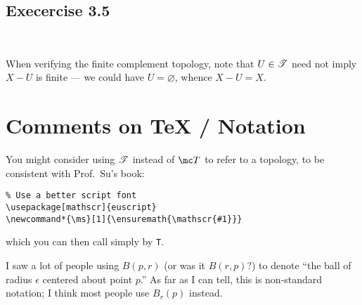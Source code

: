 \documentclass{fkpset}
\begin{document}
\subsection{Execercise 3.5}~
\begin{problem}[B1]
  When verifying the finite complement topology, note that $U \in \ms T$ need
  not imply $X - U$ is finite --- we could have $U = \varnothing$, whence $X - U
  = X$.
\end{problem}

\section{Comments on TeX / Notation}
\begin{problem}[C1]
  You might consider using $\ms T$ instead of $\mc T$ to refer to a topology, to
  be consistent with Prof.\ Su's book:
  \begin{lstlisting}
% Use a better script font
\usepackage[mathscr]{euscript}
\newcommand*{\ms}[1]{\ensuremath{\mathscr{#1}}}\end{lstlisting}\vspace{-3em}
  which you can then call simply by \texttt{\ms T}.
\end{problem}
\begin{problem}[C2]
  I saw a lot of people using $B(p, r)$ (or was it $B(r,p)$?) to denote ``the
  ball of radius $\epsilon$ centered about point $p$.'' As far as I can tell,
  this is non-standard notation; I think most people use $B_r(p)$ instead.
\end{problem}
\end{document}
